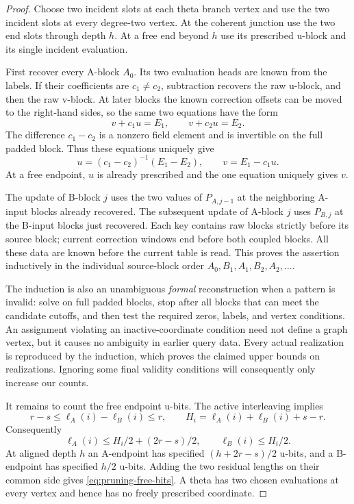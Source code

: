 \begin{proof}
Choose two incident slots at each theta branch vertex and use the two
incident slots at every degree-two vertex.  At the coherent
junction use the two end slots through depth $h$.  At a free end
beyond $h$ use its prescribed u-block and its single incident
evaluation.

First recover every A-block $A_0$.  Its two evaluation heads are
known from the labels.  If their coefficients are $c_1\ne c_2$,
subtraction recovers the raw u-block, and then the raw v-block.
At later blocks the known correction offsets can be moved to the
right-hand sides, so the same two equations have the form
\begin{equation}
\label{eq:pruning-two-evaluations}
 v+c_1u=E_1,\qquad v+c_2u=E_2.
\end{equation}
The difference $c_1-c_2$ is a nonzero field element and is invertible
on the full padded block.  Thus these equations uniquely give
\[
 u=(c_1-c_2)^{-1}(E_1-E_2),\qquad v=E_1-c_1u.
\]
At a free endpoint, $u$ is already prescribed and the one equation
uniquely gives $v$.

The update of B-block $j$ uses the two values of $P_{A,j-1}$ at the
neighboring A-input blocks already recovered.  The subsequent update
of A-block $j$ uses $P_{B,j}$ at the B-input blocks just recovered.
Each key contains raw blocks strictly before its source block;
current correction windows end before both coupled blocks.  All
these data are known before the current table is read.  This proves
the assertion inductively in the individual source-block order
$A_0,B_1,A_1,B_2,A_2,\ldots$.

The induction is also an unambiguous \emph{formal} reconstruction
when a pattern is invalid: solve on full padded blocks, stop after
all blocks that can meet the candidate cutoffs, and then test the
required zeros, labels, and vertex conditions.  An assignment
violating an inactive-coordinate condition need not define a graph
vertex, but it causes no ambiguity in earlier query data.  Every
actual realization is reproduced by the induction, which proves
the claimed upper bounds on realizations.  Ignoring some final
validity conditions will consequently only increase our counts.

It remains to count the free endpoint u-bits.  The active interleaving
implies
\[
 r-s\leq \ell_A(i)-\ell_B(i)\leq r,
 \qquad H_i=\ell_A(i)+\ell_B(i)+s-r.
\]
Consequently
\[
 \ell_A(i)\leq H_i/2+(2r-s)/2,
 \qquad \ell_B(i)\leq H_i/2.
\]
At aligned depth $h$ an A-endpoint has specified
$(h+2r-s)/2$ u-bits, and a B-endpoint has specified $h/2$ u-bits.
Adding the two residual lengths on their common side gives
\eqref{eq:pruning-free-bits}.  A theta has two chosen evaluations
at every vertex and hence has no freely prescribed coordinate.
\end{proof}

